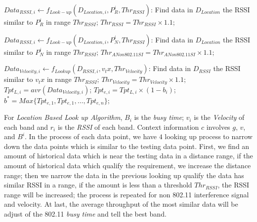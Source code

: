 \begin{algorithm}
\begin{algorithmic}[1]
\STATE $Data_{RSSI,i} \leftarrow f_{Look-up}(D_{Location,i},P_R^i,Thr_{RSSI})$: Find data in $D_{Location}$ the RSSI similar to $P_R^i$ in range $Thr_{RSSI}$;
\STATE $Thr_{RSSI}=Thr_{RSSI} \times 1.1$;
\ENDWHILE

\STATE $Data_{RSSI,i} \leftarrow f_{Look-up}(D_{Location,i},P_N^i,Thr_{RSSI})$: Find data in $D_{Location}$ the RSSI similar to $P_N^i$ in range $Thr_{RSSI}$;
\STATE $Thr_{A Non 802.11 SI}=Thr_{A Non 802.11 SI} \times 1.1$;
\ENDWHILE

\STATE $Data_{Velocity,i} \leftarrow f_{Lookup}(D_{RSSI,i},v_tx,Thr_{Velocity})$: Find data in $D_{RSSI}$ the RSSI similar to $v_tx$ in range $Thr_{RSSI}$;
\STATE $Thr_{Velocity}=Thr_{Velocity} \times 1.1$;
\ENDWHILE \\

\STATE $Tpt_{L,i}=avr(Data_{Velocity,i})$;
\STATE  $Tpt_{e,i}=Tpt_{L,i}\times(1-b_i)$;
\ENDFOR \\  
\STATE $b^*=Max\{Tpt_{e,1},Tpt_{e,1},\dots,Tpt_{e,n}\}$;\\
\end{algorithmic}
\end{algorithm}

For \emph{Location Based Look up Algorithm}, $B_i$ is the \emph{busy time}; $v_i$ 
is the \emph{Velocity} of each band and $r_i$ is the \emph{RSSI} of each band. 
Context information $c$ involves $g$, $v$, and $B^i$. In the 
process of each data point, we have $4$ looking up process to narrow down the data 
points which is similar to the testing data point. First, we find an amount of 
historical data which is near the testing data in a distance range, if the amount of 
historical data which qualify the requirement, we increase the distance range; then we 
narrow the data in the previous looking up qualify the data has similar RSSI in a 
range, if the amount is less than a threshold $Thr_{RSSI}$, the RSSI range will be 
increased; the process is repeated for non 802.11 interference signal and velocity.
At last, the average throughput of the most similar data will be adjust of the 802.11 
\emph{busy time} and tell the best band.

